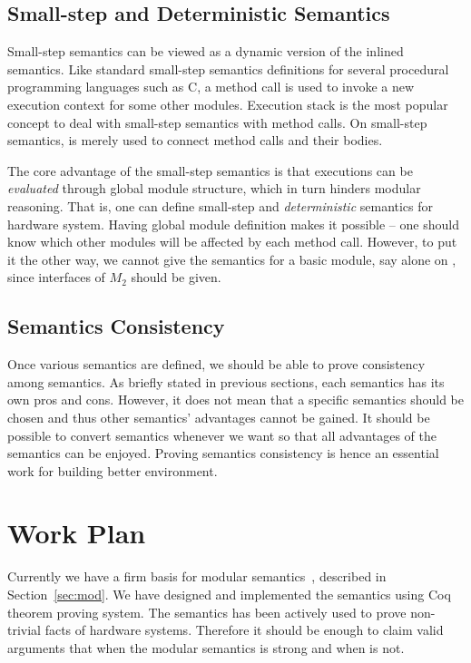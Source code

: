 \subsection{Small-step and Deterministic Semantics}

Small-step semantics can be viewed as a dynamic version of the inlined
semantics. Like standard small-step semantics definitions for several
procedural programming languages such as C, a method call is used to
invoke a new execution context for some other modules.  Execution
stack is the most popular concept to deal with small-step semantics
with method calls. On small-step semantics, \ModP{} is merely used to
connect method calls and their bodies.

The core advantage of the small-step semantics is that executions can
be \emph{evaluated} through global module structure, which in turn
hinders modular reasoning. That is, one can define small-step and
\emph{deterministic} semantics for hardware system. Having global
module definition makes it possible -- one should know which other
modules will be affected by each method call. However, to put it the
other way, we cannot give the semantics for a basic module, say
 alone on , since interfaces of $M_2$
should be given.

\subsection{Semantics Consistency}

Once various semantics are defined, we should be able to prove
consistency among semantics. As briefly stated in previous sections,
each semantics has its own pros and cons. However, it does not mean
that a specific semantics should be chosen and thus other semantics'
advantages cannot be gained. It should be possible to convert
semantics whenever we want so that all advantages of the semantics can
be enjoyed. Proving semantics consistency is hence an essential work
for building better environment.

\section{Work Plan}

Currently we have a firm basis for modular semantics~\cite{CAV},
described in Section~\ref{sec:mod}. We have designed and implemented
the semantics using Coq theorem proving system. The semantics has been
actively used to prove non-trivial facts of hardware
systems. Therefore it should be enough to claim valid arguments that
when the modular semantics is strong and when is not.

